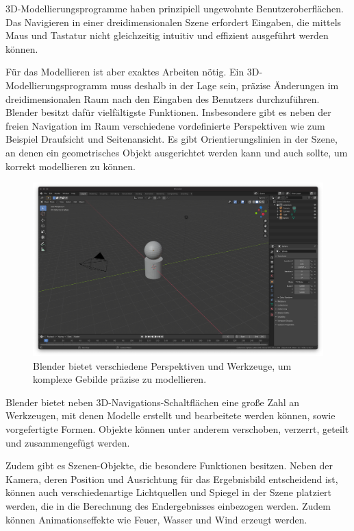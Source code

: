 3D-Modellierungsprogramme haben prinzipiell ungewohnte Benutzeroberflächen. Das Navigieren in einer dreidimensionalen Szene erfordert Eingaben, die mittels Maus und Tastatur nicht gleichzeitig intuitiv und effizient ausgeführt werden können.

Für das Modellieren ist aber exaktes Arbeiten nötig. Ein 3D-Modellierungsprogramm muss deshalb in der Lage sein, präzise Änderungen im dreidimensionalen Raum nach den Eingaben des Benutzers durchzuführen. Blender besitzt dafür vielfältigste Funktionen. Insbesondere gibt es neben der freien Navigation im Raum verschiedene vordefinierte Perspektiven wie zum Beispiel Draufsicht und Seitenansicht. Es gibt Orientierungslinien in der Szene, an denen ein geometrisches Objekt ausgerichtet werden kann und auch sollte, um korrekt modellieren zu können.

\begin{figure}[h]
	\centering
	\includegraphics[width=1\textwidth]{bilder/blender.png}

	\caption[Blender-Arbeitsbereich]{Blender bietet verschiedene Perspektiven und Werkzeuge, um komplexe Gebilde präzise zu modellieren. }

	\label{fig:blender}
\end{figure}

Blender bietet neben 3D-Navigations-Schaltflächen eine große Zahl an Werkzeugen, mit denen Modelle erstellt und bearbeitete werden können, sowie vorgefertigte Formen. Objekte können unter anderem verschoben, verzerrt, geteilt und zusammengefügt werden.

Zudem gibt es Szenen-Objekte, die besondere Funktionen besitzen. Neben der Kamera, deren Position und Ausrichtung für das Ergebnisbild entscheidend ist, können auch verschiedenartige Lichtquellen und Spiegel in der Szene platziert werden, die in die Berechnung des Endergebnisses einbezogen werden. Zudem können Animationseffekte wie Feuer, Wasser und Wind erzeugt werden.
\pagebreak

